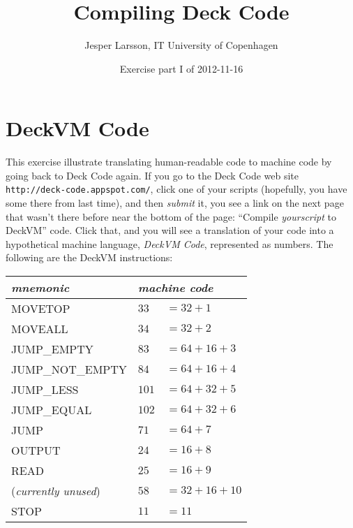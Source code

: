 \documentclass[a4paper,twoside]{tufte-handout}
\title{Compiling Deck Code}
\author{Jesper Larsson, IT University of Copenhagen}
\date{Exercise part I of 2012-11-16}
\begin{document}
\maketitle

\section{DeckVM Code}\label{sec-start}

This exercise illustrate translating human-readable code to machine
code  by
going back to Deck Code again. If you go to the Deck Code web site
\verb'http://deck-code.appspot.com/', click one of your scripts
(hopefully, you have some there from last time), and then \emph{submit} it,
you see a link on the next page that wasn't there before near the
bottom of the page: ``Compile \emph{yourscript} to DeckVM''
code.
Click that, and you will see a translation of your code into a
hypothetical machine language, \emph{DeckVM Code}, represented as
numbers. The following are the DeckVM instructions:

\medskip

\begin{tabular}{lll}
  \emph{mnemonic} & \multicolumn{2}{l}{\emph{machine code}} \\
\hline
  MOVETOP & $33$ & $= 32 + 1$ \\
  MOVEALL & $34$ & $= 32 + 2$ \\
  JUMP\_EMPTY & $83$ & $= 64 + 16 + 3$ \\
  JUMP\_NOT\_EMPTY & $84$ & $= 64 + 16 + 4$ \\
  JUMP\_LESS & $101$ & $= 64 + 32 + 5$ \\
  JUMP\_EQUAL & $102$ & $= 64 + 32 + 6$ \\
  JUMP & $71$ & $= 64 + 7$ \\
  OUTPUT & $24$ & $= 16 + 8$ \\
  READ & $25$ & $= 16 + 9$ \\
  (\emph{currently unused})& $58$ & $= 32 + 16 + 10$ \\
  STOP & $11$ & $=11$ \\
\end{tabular}
\end{document}
